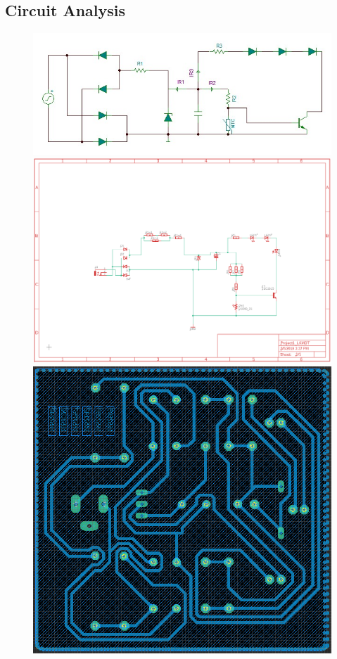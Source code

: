 \documentclass[12pt]{extarticle}
\newcommand{\<}{\langle}
\renewcommand{\>}{\rangle}
\theoremstyle{definition}
\begin{document}
\subsection{Circuit Analysis}
\begin{figure}[ht]
		\begin{center}
			
			\includegraphics[scale=0.75]{PROJECT.JPG}\\[0,5cm]
			\includegraphics[scale=0.5]{sch.PNG}\\[0,5cm]
			\includegraphics[scale=0.5]{Board.PNG}\\[0,5cm]
		\end{center}
\end{figure}
\end{document}
